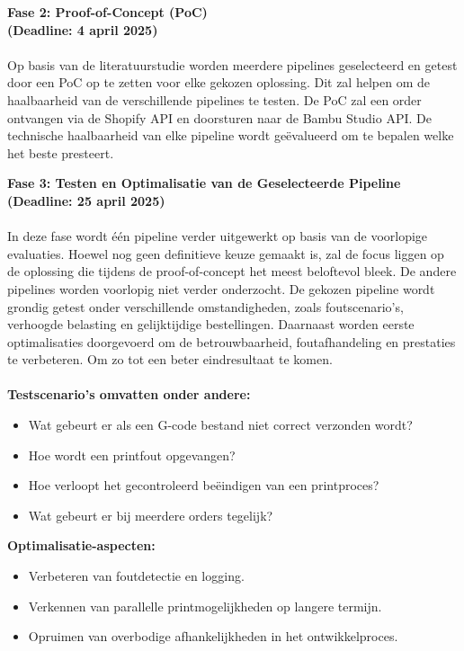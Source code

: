 \textbf{Fase 2: Proof-of-Concept (PoC)}\\
\textbf{(Deadline: 4 april 2025)}\\\\
Op basis van de literatuurstudie worden meerdere pipelines geselecteerd en getest door een PoC op te zetten voor elke gekozen oplossing. Dit zal helpen om de haalbaarheid van de verschillende pipelines te testen. De PoC zal een order ontvangen via de Shopify API en doorsturen naar de Bambu Studio API. De technische haalbaarheid van elke pipeline wordt geëvalueerd om te bepalen welke het beste presteert.
\vspace{1em}

\textbf{Fase 3: Testen en Optimalisatie van de Geselecteerde Pipeline}\\
\textbf{(Deadline: 25 april 2025)}\\\\
In deze fase wordt één pipeline verder uitgewerkt op basis van de voorlopige evaluaties. Hoewel nog geen definitieve keuze gemaakt is, zal de focus liggen op de oplossing die tijdens de proof-of-concept het meest beloftevol bleek. De andere pipelines worden voorlopig niet verder onderzocht.
\vspace{2em}
De gekozen pipeline wordt grondig getest onder verschillende omstandigheden, zoals foutscenario’s, verhoogde belasting en gelijktijdige bestellingen. Daarnaast worden eerste optimalisaties doorgevoerd om de betrouwbaarheid, foutafhandeling en prestaties te verbeteren. Om zo tot een beter eindresultaat te komen.
\\\\
\textbf{Testscenario’s omvatten onder andere:}
\begin{itemize}
    \item Wat gebeurt er als een G-code bestand niet correct verzonden wordt?
    \item Hoe wordt een printfout opgevangen?
    \item Hoe verloopt het gecontroleerd beëindigen van een printproces?
    \item Wat gebeurt er bij meerdere orders tegelijk?
\end{itemize}

\vspace{1em}
\textbf{Optimalisatie-aspecten:}
\begin{itemize}
    \item Verbeteren van foutdetectie en logging.
    \item Verkennen van parallelle printmogelijkheden op langere termijn.
    \item Opruimen van overbodige afhankelijkheden in het ontwikkelproces.
\end{itemize}

